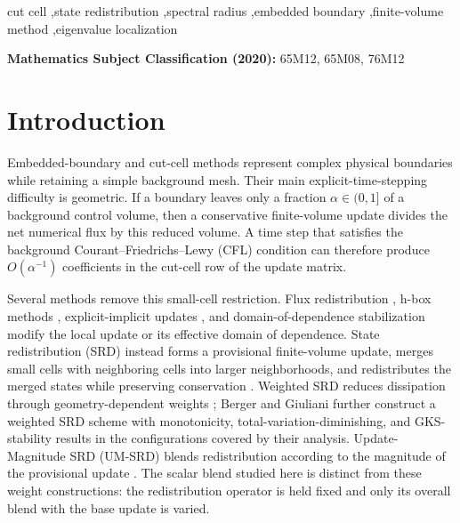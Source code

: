 \documentclass[preprint,12pt]{elsarticle}
\begin{document}
\begin{frontmatter}
\begin{keyword}
cut cell \sep state redistribution \sep spectral radius \sep embedded boundary
\sep finite-volume method \sep eigenvalue localization
\end{keyword}

\end{frontmatter}

\noindent\textbf{Mathematics Subject Classification (2020):}
65M12, 65M08, 76M12


\section{Introduction}
\label{sec:intro}

Embedded-boundary and cut-cell methods represent complex physical boundaries
while retaining a simple background mesh.  Their main explicit-time-stepping
difficulty is geometric.  If a boundary leaves only a fraction
$\alpha\in(0,1]$ of a background control volume, then a conservative
finite-volume update divides the net numerical flux by this reduced volume.
A time step that satisfies the background Courant--Friedrichs--Lewy (CFL) condition can therefore produce
$O(\alpha^{-1})$ coefficients in the cut-cell row of the update matrix.

Several methods remove this small-cell restriction.  Flux redistribution
\cite{ColellGravesKeenModiano2006}, h-box methods
\cite{BergerHelzelLeVeque2003}, explicit-implicit updates
\cite{MayBerger2017,MayLaakmann2024}, and domain-of-dependence stabilization
\cite{EngwerMayNussingStreitburger2020,MayStreitburger2022,Giuliani2022,PetriBirkeEngwerRanocha2026}
modify the local update or its effective domain of dependence.  State
redistribution (SRD) instead forms a provisional finite-volume update, merges
small cells with neighboring cells into larger neighborhoods, and
redistributes the merged states while preserving conservation
\cite{BergerGiuliani2021}.  Weighted SRD reduces dissipation through
geometry-dependent weights \cite{GiulianiEtAl2022}; Berger and Giuliani
\cite{BergerGiuliani2024} further construct a weighted SRD scheme with
monotonicity, total-variation-diminishing, and GKS-stability results in the
configurations covered by their analysis.  Update-Magnitude SRD (UM-SRD)
blends redistribution according to the magnitude of the provisional update
\cite{Karell2026}.  The scalar blend studied here is distinct from these
weight constructions: the redistribution operator is held fixed and only its
overall blend with the base update is varied.
\end{document}
